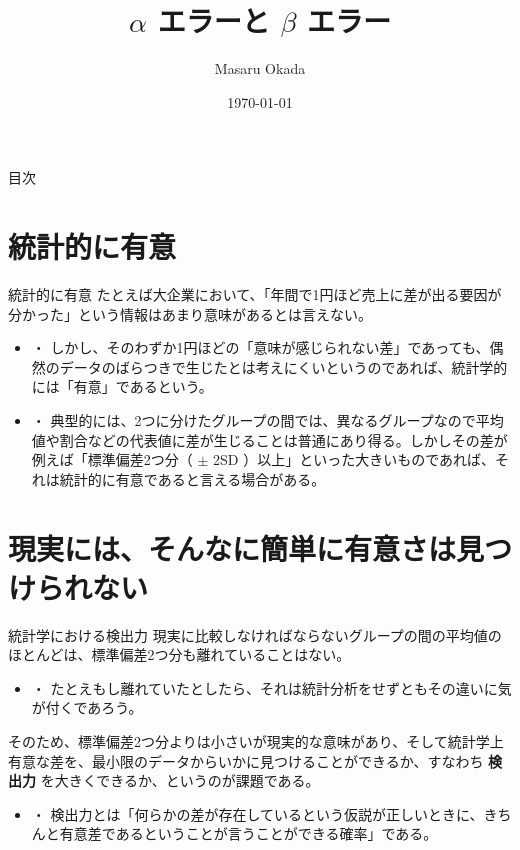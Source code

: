 \documentclass[dvipdfmx, autodetect-engine, aspectratio=169, 10.5pt]{beamer}
\title{$\alpha$ エラーと $\beta$ エラー}
\author{Masaru Okada}
\date{\today}
\begin{document}
\begin{frame}[plain]
	\titlepage
\end{frame}

\begin{frame}{目次}
	\tableofcontents
\end{frame}

\section{統計的に有意}

\begin{frame}{統計的に有意}
	たとえば大企業において、「年間で1円ほど売上に差が出る要因が分かった」という情報はあまり意味があるとは言えない。
	\begin{itemize}
		\item ・ しかし、そのわずか1円ほどの「意味が感じられない差」であっても、偶然のデータのばらつきで生じたとは考えにくいというのであれば、統計学的には「有意」であるという。
		\item ・ 典型的には、2つに分けたグループの間では、異なるグループなので平均値や割合などの代表値に差が生じることは普通にあり得る。しかしその差が例えば「標準偏差2つ分（ $\pm$ 2SD ）以上」といった大きいものであれば、それは統計的に有意であると言える場合がある。
	\end{itemize}
\end{frame}

\section{現実には、そんなに簡単に有意さは見つけられない}

\begin{frame}{統計学における検出力}
	現実に比較しなければならないグループの間の平均値のほとんどは、標準偏差2つ分も離れていることはない。
	\begin{itemize}
		\item ・ たとえもし離れていたとしたら、それは統計分析をせずともその違いに気が付くであろう。
	\end{itemize}
	そのため、標準偏差2つ分よりは小さいが現実的な意味があり、そして統計学上有意な差を、最小限のデータからいかに見つけることができるか、すなわち \textbf{検出力} を大きくできるか、というのが課題である。
	\begin{itemize}
		\item ・ 検出力とは「何らかの差が存在しているという仮説が正しいときに、きちんと有意差であるということが言うことができる確率」である。
	\end{itemize}
\end{frame}
\end{document}
